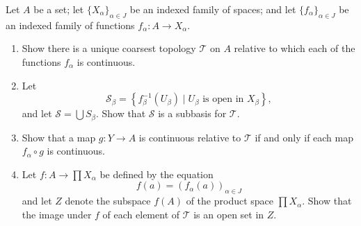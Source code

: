 \documentclass[a4paper,10pt]{article}
\newcommand{\inv}{^{-1}}
\begin{document}
\begin{exercise}[ID=2.19.10]
    Let $A$ be a set; let $\{X_\alpha\}_{\alpha \in J}$ be an indexed family of spaces; and let $\{f_\alpha\}_{\alpha \in J}$ be an indexed family of functions $f_\alpha: A \rightarrow X_\alpha$.

    \begin{enumerate}[label={(\alph*)}, align=left, leftmargin=\parindent, listparindent=\parindent, labelwidth=0pt, itemindent=!]
        \item Show there is a unique coarsest topology $\mathcal{T}$ on $A$ relative to which each of the functions $f_\alpha$ is continuous.
        \item Let
        \begin{equation*}
            \mathcal{S}_\beta = \left\{f_\beta\inv(U_\beta) \mid U_\beta \text{ is open in } X_\beta\right\},
        \end{equation*}
        and let $\mathcal{S} = \bigcup S_\beta$.
        Show that $\mathcal{S}$ is a subbasis for $\mathcal{T}$.
        \item Show that a map $g: Y \rightarrow A$ is continuous relative to $\mathcal{T}$ if and only if each map $f_\alpha \circ g$ is continuous.
        \item Let $f: A \rightarrow \prod X_\alpha$ be defined by the equation
        \begin{equation*}
            f(a) = (f_\alpha(a))_{\alpha \in J}
        \end{equation*}
        and let $Z$ denote the subspace $f(A)$ of the product space $\prod X_\alpha$.
        Show that the image under $f$ of each element of $\mathcal{T}$ is an open set in $Z$.
    \end{enumerate}
\end{exercise}
\end{document}
